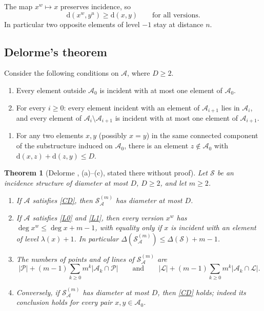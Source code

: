 \documentclass[11pt]{amsart}
\newtheorem{theorem}{Theorem}[section]
\theoremstyle{definition}
\theoremstyle{remark}
\newcommand{\cS}{\mathcal{S}}
\newcommand{\cP}{\mathcal{P}}
\newcommand{\cL}{\mathcal{L}}
\newcommand{\cA}{\mathcal{A}}
\newcommand{\dd}{\mathrm{d}}
\newcommand{\Dbl}[2]{{#1}^{(#2)}_{\cA}}
\begin{document}
The map $x^w\mapsto x$ preserves incidence, so
\begin{equation}\label{eq:proj}
\dd(x^w,y^u)\ge\dd(x,y)\qquad\text{for all versions.}
\end{equation}
In particular two opposite elements of level $-1$ stay at distance $n$.

\subsection{Delorme's theorem}
Consider the following conditions on $\cA$, where $D\ge2$.
\begin{enumerate}[label=\textup{(L\arabic*)},leftmargin=3em,start=0]
\item\label{L0} Every element outside $\cA_0$ is incident with at most one element of $\cA_0$.
\item\label{L1} For every $i\ge0$: every element incident with an element of $\cA_{i+1}$ lies in $\cA_i$, and every element of $\cA_i\setminus\cA_{i+1}$ is incident with at most one element of $\cA_{i+1}$.
\end{enumerate}
\begin{enumerate}[label=\textup{(C$_D$)},leftmargin=3em]
\item\label{CD} For any two elements $x,y$ (possibly $x=y$) in the same connected component of the substructure induced on $\cA_0$, there is an element $z\notin\cA_0$ with $\dd(x,z)+\dd(z,y)\le D$.
\end{enumerate}

\begin{theorem}[Delorme {\cite[\S7]{D85a}}, (a)--(c), stated there without proof]\label{thm:delorme}
Let $\cS$ be an incidence structure of diameter at most $D$, $D\ge2$, and let $m\ge2$.
\begin{enumerate}[label=\textup{(\alph*)}]
\item If $\cA$ satisfies \ref{CD}, then $\Dbl{\cS}{m}$ has diameter at most $D$.
\item If $\cA$ satisfies \ref{L0} and \ref{L1}, then every version $x^w$ has $\deg x^w\le\deg x+m-1$, with equality only if $x$ is incident with an element of level $\lambda(x)+1$. In particular $\Delta(\Dbl{\cS}{m})\le\Delta(\cS)+m-1$.
\item The numbers of points and of lines of $\Dbl{\cS}{m}$ are
\[
|\cP|+(m-1)\sum_{k\ge0}m^k|\cA_k\cap\cP|\qquad\text{and}\qquad |\cL|+(m-1)\sum_{k\ge0}m^k|\cA_k\cap\cL|.
\]
\item Conversely, if $\Dbl{\cS}{m}$ has diameter at most $D$, then \ref{CD} holds; indeed its conclusion holds for every pair $x,y\in\cA_0$.
\end{enumerate}
\end{theorem}
\end{document}
